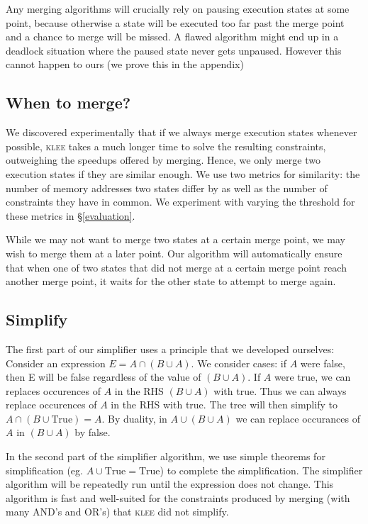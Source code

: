 \documentclass[12pt,a4paper]{article}
\newcommand{\klee}{\textsc{klee }}
\begin{document}
Any merging algorithms will crucially rely on pausing execution states at some point, because otherwise a state will be executed too far past the merge point and a chance to merge will be missed. A flawed algorithm might end up in a deadlock situation where the paused state never gets unpaused. However this cannot happen to ours (we prove this in the appendix)


\subsection{When to merge?}
We discovered experimentally that if we always merge execution states whenever possible, \klee takes a much longer time to solve the resulting constraints, outweighing the speedups offered by merging. Hence, we only merge two execution states if they are similar enough. We use two metrics for similarity: the number of memory addresses two states differ by as well as the number of constraints they have in common. We experiment with varying the threshold for these metrics in \S\ref{evaluation}.

While we may not want to merge two states at a certain merge point, we may wish to merge them at a later point. Our algorithm will automatically ensure that when one of two states that did not merge at a certain merge point reach another merge point, it waits for the other state to attempt to merge again.

\subsection{Simplify}
The first part of our simplifier uses a principle that we developed ourselves:
Consider an expression $E = A\cap(B\cup A)$. We consider cases: if $A$ were false, then E will be false regardless of the value of $(B\cup A)$. If $A$ were true, we can replaces occurences of $A$ in the RHS $(B\cup A)$ with true. Thus we can always replace occurences of $A$ in the RHS with true. The tree will then simplify to $A\cap(B\cup \text{True}) = A$. By duality, in $A\cup(B\cup A)$ we can replace occurances of $A$ in $(B\cup A)$ by false.

In the second part of the simplifier algorithm, we use simple theorems for simplification (eg. $A\cup \text{True} = \text{True}$) to complete the simplification. The simplifier algorithm will be repeatedly run until the expression does not change. This algorithm is fast and well-suited for the constraints produced by merging (with many AND's and OR's) that \klee did not simplify.
\end{document}
